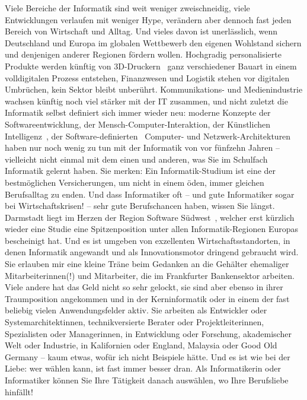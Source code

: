 {Viele Bereiche der Informatik sind weit weniger zweischneidig, viele Entwicklungen verlaufen mit weniger Hype, verändern aber dennoch fast jeden Bereich von Wirtschaft und Alltag. Und vieles davon ist unerlässlich, wenn Deutschland und Europa im globalen Wettbewerb den eigenen Wohlstand sichern und denjenigen anderer Regionen fördern wollen. Hochgradig personalisierte Produkte werden künftig von \glqq 3D-Druckern\grqq~ ganz verschiedener Bauart in einem volldigitalen Prozess entstehen, Finanzwesen und Logistik stehen vor \glqq digitalen\grqq~ Umbrüchen, kein Sektor bleibt unberührt. Kommunikations- und Medienindustrie wachsen künftig noch viel stärker mit der IT zusammen, und nicht zuletzt die Informatik selbst definiert sich immer wieder neu: moderne Konzepte der Softwareentwicklung, der Mensch-Computer-Interaktion, der \glqq Künstlichen Intelligenz\grqq~, der \glqq Software-definierten\grqq~ Computer- und Netzwerk-Architekturen haben nur noch wenig zu tun mit der Informatik von vor fünfzehn Jahren -- vielleicht nicht einmal mit dem einen und anderen, was Sie im Schulfach Informatik gelernt haben. Sie merken: Ein Informatik-Studium ist eine der bestmöglichen Versicherungen, um nicht in einem öden, immer gleichen Berufsalltag zu enden. Und dass Informatiker oft -- und gute Informatiker sogar bei Wirtschaftskrisen! -- sehr gute Berufschancen haben, wissen Sie längst. Darmstadt liegt im Herzen der Region \glqq Software Südwest\grqq~, welcher erst kürzlich wieder eine Studie eine Spitzenposition unter allen Informatik-Regionen Europas bescheinigt hat. Und es ist umgeben von exzellenten Wirtschaftsstandorten, in denen Informatik angewandt und als Innovationsmotor dringend gebraucht wird. Sie erlauben mir eine kleine Träne beim Gedanken an die Gehälter ehemaliger Mitarbeiterinnen(!) und Mitarbeiter, die im Frankfurter Bankensektor arbeiten. Viele andere hat das Geld nicht so sehr gelockt, sie sind aber ebenso in ihrer Traumposition angekommen und in der Kerninformatik oder in einem der fast beliebig vielen Anwendungsfelder aktiv. Sie arbeiten als Entwickler oder Systemarchitektinnen, technikversierte Berater oder Projektleiterinnen, Spezialisten oder Managerinnen, in Entwicklung oder Forschung, akademischer Welt oder Industrie, in Kalifornien oder England, Malaysia oder Good Old Germany -- kaum etwas, wofür ich nicht Beispiele hätte. Und es ist wie bei der Liebe: wer wählen kann, ist fast immer besser dran. Als Informatikerin oder Informatiker können Sie Ihre Tätigkeit danach auswählen, wo Ihre Berufsliebe hinfällt!


}
